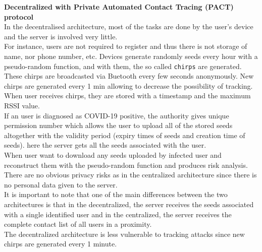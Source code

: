 \documentclass[a4paper, twocolumn]{article}
\begin{document}
\noindent \textbf{Decentralized with Private Automated Contact Tracing (PACT) protocol}\\
In the decentralised architecture, most of the tasks are done by the user's device and the server is involved very little.\\
For instance, users are not required to register and thus there is not storage of name, nor phone number, etc. Devices generate randomly seeds every hour with a pseudo-random function, and with them, the so called \texttt{chirps} are generated. These chirps are broadcasted via Buetooth every few seconds anonymously. New chirps are generated every 1 min allowing to decrease the possibility of tracking. When user receives chirps, they are stored with a timestamp and the maximum RSSI value.\\
If an user is diagnosed as COVID-19 positive, the authority gives unique permission number which allows the user to upload all of the stored seeds altogether with the validity period (expiry times of seeds and creation time of seeds). here the server gets all the seeds associated with the user.\\
When user want to download any seeds uploaded by infected user and reconstruct them with the pseudo-random function and produces risk analysis.\\

\noindent There are no obvious privacy risks as in the centralized architecture since there is no personal data given to the server.\\
It is important to note that one of the main differences between the two architectures is that in the decentralized, the server receives the seeds associated with a single identified user and in the centralized, the server receives the complete contact list of all users in a proximity.\\
The decentralized architecture is less vulnerable to tracking attacks since new chirps are generated every 1 minute.\\
\end{document}
